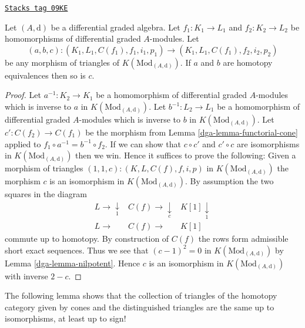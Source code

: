 \begin{lemma}
\label{dga-lemma-third-isomorphism}
\href{https://stacks.math.columbia.edu/tag/09KE}{\texttt{Stacks tag 09KE}}

Let $(A, \text{d})$ be a differential graded algebra.
Let $f_1 : K_1 \to L_1$ and $f_2 : K_2 \to L_2$ be homomorphisms of
differential graded $A$-modules. Let
$$
(a, b, c) :
(K_1, L_1, C(f_1), f_1, i_1, p_1)
\longrightarrow
(K_1, L_1, C(f_1), f_2, i_2, p_2)
$$
be any morphism of triangles of $K(\text{Mod}_{(A, \text{d})})$.
If $a$ and $b$ are homotopy equivalences then so is $c$.
\end{lemma}

\begin{proof}

Let $a^{-1} : K_2 \to K_1$ be a homomorphism of differential graded $A$-modules
which is inverse to $a$ in $K(\text{Mod}_{(A, \text{d})})$.
Let $b^{-1} : L_2 \to L_1$ be a homomorphism of differential graded $A$-modules
which is inverse to $b$ in $K(\text{Mod}_{(A, \text{d})})$.
Let $c' : C(f_2) \to C(f_1)$ be the morphism from
Lemma \ref{dga-lemma-functorial-cone} applied to
$f_1 \circ a^{-1} = b^{-1} \circ f_2$.
If we can show that $c \circ c'$ and $c' \circ c$ are isomorphisms in
$K(\text{Mod}_{(A, \text{d})})$
then we win. Hence it suffices to prove the following: Given
a morphism of triangles
$(1, 1, c) : (K, L, C(f), f, i, p)$
in $K(\text{Mod}_{(A, \text{d})})$ the morphism $c$ is an isomorphism
in $K(\text{Mod}_{(A, \text{d})})$.
By assumption the two squares in the diagram
$$
\begin{array}{ccc}L \longrightarrow\underset{1}{\downarrow} & C(f) \longrightarrow\underset{c}{\downarrow} & K[1] \underset{1}{\downarrow} \\ L \longrightarrow & C(f) \longrightarrow & K[1]\end{array}
$$
commute up to homotopy. By construction of $C(f)$ the rows
form admissible short exact sequences. Thus we see that
$(c - 1)^2 = 0$ in $K(\text{Mod}_{(A, \text{d})})$ by
Lemma \ref{dga-lemma-nilpotent}.
Hence $c$ is an isomorphism in $K(\text{Mod}_{(A, \text{d})})$
with inverse $2 - c$.
\end{proof}

The following lemma shows that the collection of triangles of the homotopy
category given by cones and the distinguished triangles are the same
up to isomorphisms, at least up to sign!

